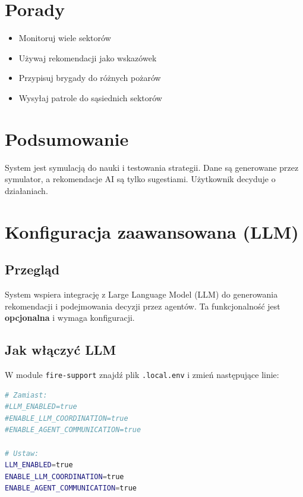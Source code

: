 \section{Porady}

\begin{itemize}
    \item Monitoruj wiele sektorów
    \item Używaj rekomendacji jako wskazówek
    \item Przypisuj brygady do różnych pożarów
    \item Wysyłaj patrole do sąsiednich sektorów
\end{itemize}

\section{Podsumowanie}

System jest symulacją do nauki i testowania strategii. Dane są generowane przez symulator, a rekomendacje AI są tylko sugestiami. Użytkownik decyduje o działaniach.

\section{Konfiguracja zaawansowana (LLM)}

\subsection{Przegląd}

System wspiera integrację z Large Language Model (LLM) do generowania rekomendacji i podejmowania decyzji przez agentów. Ta funkcjonalność jest \textbf{opcjonalna} i wymaga konfiguracji.

\subsection{Jak włączyć LLM}

W module \texttt{fire-support} znajdź plik \texttt{.local.env} i zmień następujące linie:

\begin{lstlisting}[language=bash, basicstyle=\small]
# Zamiast:
#LLM_ENABLED=true
#ENABLE_LLM_COORDINATION=true
#ENABLE_AGENT_COMMUNICATION=true

# Ustaw:
LLM_ENABLED=true
ENABLE_LLM_COORDINATION=true
ENABLE_AGENT_COMMUNICATION=true
\end{lstlisting}


